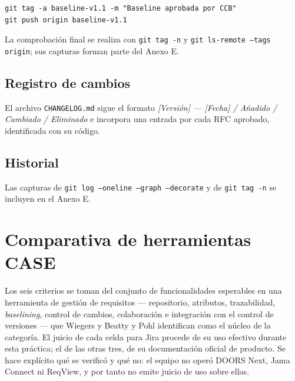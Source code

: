 \documentclass[11pt,letterpaper]{article}
\begin{document}
\begin{lstlisting}[basicstyle=\footnotesize\ttfamily, frame=single]
git tag -a baseline-v1.1 -m "Baseline aprobada por CCB"
git push origin baseline-v1.1
\end{lstlisting}

La comprobación final se realiza con \texttt{git tag -n} y
\texttt{git ls-remote --tags origin}; sus capturas forman parte del Anexo E.

\subsection{Registro de cambios}

El archivo \texttt{CHANGELOG.md} sigue el formato \emph{[Versión] --- [Fecha] / Añadido / Cambiado /
Eliminado} e incorpora una entrada por cada RFC aprobado, identificada con su código.

\subsection{Historial}

Las capturas de \texttt{git log --oneline --graph --decorate} y de \texttt{git tag -n} se incluyen en
el Anexo E.

\section{Comparativa de herramientas CASE}
\label{sec:comparativa}

Los seis criterios se toman del conjunto de funcionalidades esperables en una herramienta de
gestión de requisitos --- repositorio, atributos, trazabilidad, \emph{baselining}, control de
cambios, colaboración e integración con el control de versiones --- que Wiegers y Beatty
\cite{wiegers2013} y Pohl \cite{pohl2025} identifican como el núcleo de la categoría. El juicio de
cada celda para Jira procede de su uso efectivo durante esta práctica; el de las otras tres, de su
documentación oficial de producto. Se hace explícito qué se verificó y qué no: el equipo no operó
DOORS Next, Jama Connect ni ReqView, y por tanto no emite juicio de uso sobre ellas.
\end{document}
